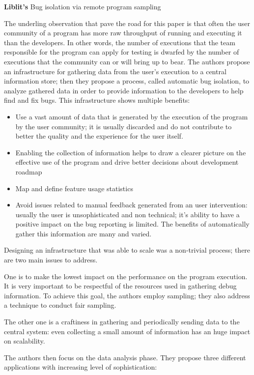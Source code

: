 \noindent \textbf{Liblit's} \cite{liblit2003bug} Bug isolation via remote program sampling

The underling observation that pave the road for this paper is that often the user community of a program has more raw throughput of running and executing it than the developers. In other words, the number of executions that the team responsible for the program can apply for testing is dwarfed by the number of executions that the community can or will bring up to bear.
The authors propose an infrastructure for gathering data from the user's execution to a central information store; then they propose a process, called automatic bug isolation, to analyze gathered data in order to provide information to the developers to help find and fix bugs.
This infrastructure shows multiple benefits:

\begin{itemize} 
\item Use a vast amount of data that is generated by the execution of the program by the user community; it is usually discarded and do not contribute to better the quality and the experience for the user itself.
\item Enabling the collection of information helps to draw a clearer picture on the effective use of the program and drive better decisions about development roadmap
\item Map and define feature usage statistics
\item Avoid issues related to manual feedback generated from an user intervention: usually the user is unsophisticated and non technical; it's ability to have a positive impact on the bug reporting is limited. The benefits of automatically gather this information are many and varied.
\end{itemize}

Designing an infrastructure that was able to scale was a non-trivial process; there are two main issues to address.

One is to make the lowest impact on the performance on the program execution. It is very important to be respectful of the resources used in gathering debug information. To achieve this goal, the authors employ sampling; they also address a technique to conduct fair sampling.

The other one is a craftiness in gathering and periodically sending data to the central system: even collecting a small amount of information has an huge impact on scalability.

The authors then focus on the data analysis phase. They propose three different applications with increasing level of sophistication:

